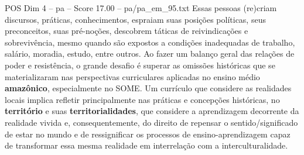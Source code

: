 \begin{textsample}{POS Dim 4 – pa – Score 17.00 – pa/pa\_em\_95.txt}
Essas pessoas (re)criam discursos, práticas, conhecimentos, espraiam suas posições políticas, seus preconceitos, suas pré-noções, descobrem táticas de reivindicações e sobrevivência, mesmo quando são expostos a condições inadequadas de trabalho, salário, moradia, estudo, entre outros.
Ao fazer um balanço geral das relações de poder e resistência, o grande desafio é superar as omissões históricas que se materializaram nas perspectivas curriculares aplicadas no ensino médio \textbf{amazônico}, especialmente no SOME.
Um currículo que considere as realidades locais implica refletir principalmente nas práticas e concepções históricas, no \textbf{território} e suas \textbf{territorialidades}, que considere a aprendizagem decorrente da realidade vivida e, consequentemente, do direito de repensar o sentido/significado de estar no mundo e de ressignificar os processos de ensino-aprendizagem capaz de transformar essa mesma realidade em interrelação com a interculturalidade.

\end{textsample}
